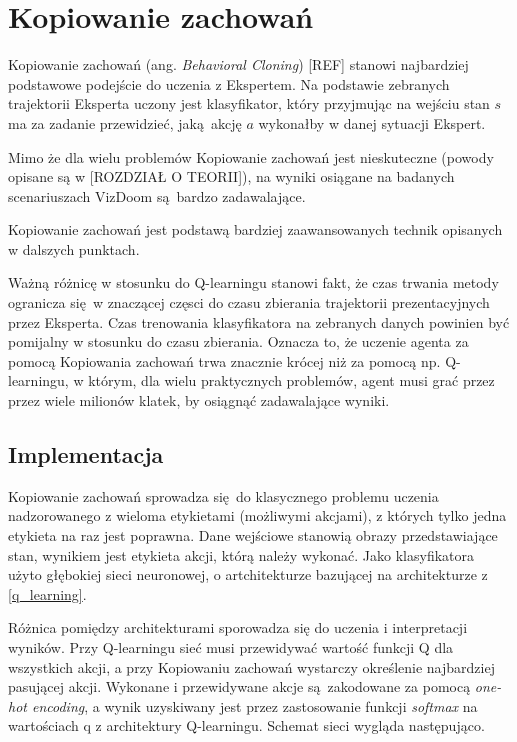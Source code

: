 \section{Kopiowanie zachowań} \label{behavioral_cloning}

Kopiowanie zachowań (ang. \textit{Behavioral Cloning}) [REF] stanowi najbardziej podstawowe podejście do uczenia z Ekspertem. Na podstawie zebranych trajektorii Eksperta uczony jest klasyfikator, który przyjmując na wejściu stan $s$ ma za zadanie przewidzieć, jaką akcję $a$ wykonałby w danej sytuacji Ekspert.

Mimo że dla wielu problemów Kopiowanie zachowań jest nieskuteczne (powody opisane są w [ROZDZIAŁ O TEORII]), na wyniki osiągane na badanych scenariuszach VizDoom są bardzo zadawalające.

Kopiowanie zachowań jest podstawą bardziej zaawansowanych technik opisanych w dalszych punktach.

Ważną różnicę w stosunku do Q-learningu stanowi fakt, że czas trwania metody ogranicza się w znaczącej częsci do czasu zbierania trajektorii prezentacyjnych przez Eksperta. Czas trenowania klasyfikatora na zebranych danych powinien być pomijalny w stosunku do czasu zbierania. Oznacza to, że uczenie agenta za pomocą Kopiowania zachowań trwa znacznie krócej niż za pomocą np. Q-learningu, w którym, dla wielu praktycznych problemów, agent musi grać przez przez wiele milionów klatek, by osiągnąć zadawalające wyniki. 

\subsection{Implementacja}

Kopiowanie zachowań sprowadza się do klasycznego problemu uczenia nadzorowanego z wieloma etykietami (możliwymi akcjami), z których tylko jedna etykieta na raz jest poprawna. Dane wejściowe stanowią obrazy przedstawiające stan, wynikiem jest etykieta akcji, którą należy wykonać. Jako klasyfikatora użyto głębokiej sieci neuronowej, o artchitekturze bazującej na architekturze z \ref{q_learning}.

Różnica pomiędzy architekturami sporowadza się do uczenia i interpretacji wyników. Przy Q-learningu sieć musi przewidywać wartość funkcji Q dla wszystkich akcji, a przy Kopiowaniu zachowań wystarczy określenie najbardziej pasującej akcji. Wykonane i przewidywane akcje są zakodowane za pomocą \textit{one-hot encoding}, a wynik uzyskiwany jest przez zastosowanie funkcji \textit{softmax} na wartościach q z architektury Q-learningu. Schemat sieci wygląda następująco.

